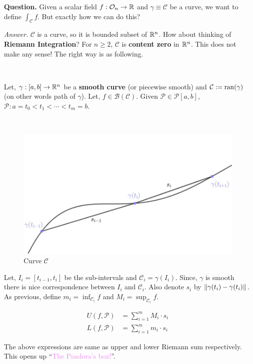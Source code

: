 \documentclass[../Analysis-3.tex]{subfiles}
\begin{document}
\textbf{Question.} Given a scalar field $f : \mathcal{O}_{n} \to \mathbb{R}$ and $\gamma \equiv \mathcal{C}$ be a curve, we want to define $\displaystyle\int_{\mathcal{C}} f$. But exactly how we can do this?

\textit{Answer.} $\mathcal{C}$ is a curve, so it is bounded subset of $\mathbb{R}^n$. How about thinking of \textbf{Riemann Integration}? For $n \ge 2$, $\mathcal{C}$ is \textbf{content zero} in $\mathbb{R}^n$. This does not make any sense! The right way is as following.

\

Let, $\gamma :[a,b]\to \mathbb{R}^n$ be a \textbf{smooth curve} (or piecewise smooth) and $\mathcal{C} := \operatorname{ran}(\gamma)$ (on other words path of $\gamma$). Let, $f \in \mathscr{B}(\mathcal{C})$. Given $\mathcal{P} \in \mathscr{P}[a,b]$, $\mathcal{P} : a = t_0 < t_1 < \cdots < t_m = b$.

\

\begin{figure}
  \centering
  \includegraphics[width=.98\linewidth]{../figures/lec-23.1.png}
  \caption{Curve $\mathcal{C}$}
\end{figure}

Let, $I_i = [t_{i-1},t_i]$ be the sub-intervals and $\mathcal{C}_i = \gamma(I_i)$. Since, $\gamma$ is smooth there is nice correspondence between $I_i$ and $\mathcal{C}_i$. Also denote $s_i$ by $\norm{\gamma(t_i) - \gamma(t_i)}$. As previous, define $m_i = \inf_{\mathcal{C}_i}f$ and $M_i = \sup_{\mathcal{C}_i}f$.

\begin{align*}
  U(f,\mathcal{P}) & = \sum_{i=1}^{m}M_i\cdot s_i \\
  L(f,\mathcal{P}) & = \sum_{i=1}^{m}m_i\cdot s_i
\end{align*}

The above expressions are same as upper and lower Riemann sum respectively. This opens up ``\textcolor{violet}{The Pandora's box!}''.
\end{document}

